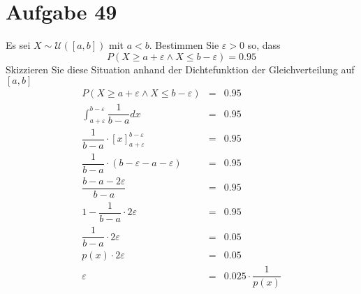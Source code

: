 \section{Aufgabe 49}
\setcounter{section}{49}

Es sei $X \sim \mathcal{U}([a, b])$ mit $a < b$. Bestimmen Sie $\varepsilon > 0$ so, dass
\begin{equation*}
    P(X \geq a + \varepsilon \land X \leq b - \varepsilon) = 0.95
\end{equation*}
Skizzieren Sie diese Situation anhand der Dichtefunktion der Gleichverteilung auf $[a, b]$
\begin{equation*}
    \begin{array}{rcl}
        P(X \geq a + \varepsilon \land X \leq b - \varepsilon) &=& 0.95 \\[10pt]
        \int_{a + \varepsilon}^{b - \varepsilon}\dfrac{1}{b - a}dx &=& 0.95 \\[10pt]
        \dfrac{1}{b - a} \cdot [x]_{a + \varepsilon}^{b - \varepsilon} &=& 0.95 \\[10pt]
        \dfrac{1}{b - a} \cdot (b - \varepsilon - a - \varepsilon) &=& 0.95 \\[10pt]
        \dfrac{b - a - 2\varepsilon}{b - a} &=& 0.95 \\[10pt]
        1 - \dfrac{1}{b - a} \cdot 2\varepsilon &=& 0.95 \\[10pt]
        \dfrac{1}{b - a} \cdot 2\varepsilon &=& 0.05 \\[10pt]
        p(x) \cdot 2\varepsilon &=& 0.05 \\[10pt]
        \varepsilon &=& 0.025 \cdot \dfrac{1}{p(x)}
    \end{array}
\end{equation*}
